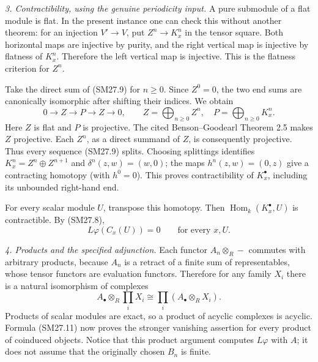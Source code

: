 \emph{3. Contractibility, using the genuine periodicity input.}
A pure submodule of a flat module is flat.  In the present instance
one can check this without another theorem: for an injection
\(V'\to V\), put \(Z^n\to K_x^n\) in the tensor square.
Both horizontal maps are injective by purity, and the right vertical
map is injective by flatness of \(K_x^n\).  Therefore the left
vertical map is injective.  This is the flatness criterion for
\(Z^n\).

Take the direct sum of (SM27.9) for \(n\ge0\).
Since \(Z^0=0\), the two end sums are canonically isomorphic after
shifting their indices.  We obtain
\[
 0\longrightarrow Z\longrightarrow P\longrightarrow Z
 \longrightarrow0,\qquad
 Z=\bigoplus_{n\ge0}Z^n,\quad P=\bigoplus_{n\ge0}K_x^n.
 \tag{SM27.10}
\]
Here \(Z\) is flat and \(P\) is projective.
The cited Benson--Goodearl Theorem 2.5 makes \(Z\) projective.
Each \(Z^n\), as a direct summand of \(Z\), is consequently
projective.  Thus every sequence (SM27.9) splits.
Choosing splittings identifies
\(K_x^n=Z^n\oplus Z^{n+1}\) and
\(\delta^n(z,w)=(w,0)\); the maps
\(h^n(z,w)=(0,z)\) give a contracting homotopy
(with \(h^0=0\)).  This proves contractibility of \(K_x^\bullet\),
including its unbounded right-hand end.

For every scalar module \(U\), transpose this homotopy.
Then \(\operatorname{Hom}_k(K_x^\bullet,U)\) is contractible.
By (SM27.8),
\[
 L\varphi(C_x(U))=0\qquad\text{for every }x,U.
 \tag{SM27.11}
\]

\emph{4. Products and the specified adjunction.}
Each functor \(A_n\otimes_R-\) commutes with arbitrary products,
because \(A_n\) is a retract of a finite sum of representables,
whose tensor functors are evaluation functors.
Therefore for any family \(X_i\) there is a natural isomorphism of
complexes
\[
 A_\bullet\otimes_R\prod_iX_i
   \cong\prod_i(A_\bullet\otimes_R X_i).
 \tag{SM27.12}
\]
Products of scalar modules are exact, so a product of acyclic
complexes is acyclic.  Formula (SM27.11) now proves the stronger
vanishing assertion for every product of coinduced objects.
Notice that this product argument computes \(L\varphi\) with \(A\);
it does not assume that the originally chosen \(B_n\) is finite.


